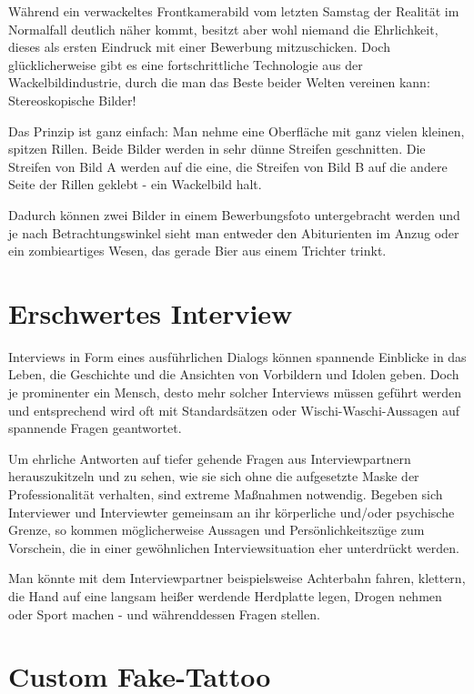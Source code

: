 \documentclass[a5paper,pagesize,10pt,bibtotoc,pointlessnumbers,normalheadings,DIV=9,twoside=false]{scrbook}
\begin{document}
Während ein verwackeltes Frontkamerabild vom letzten Samstag der Realität im Normalfall deutlich näher kommt, besitzt aber wohl niemand die Ehrlichkeit, dieses als ersten Eindruck mit einer Bewerbung mitzuschicken.
Doch glücklicherweise gibt es eine fortschrittliche Technologie aus der Wackelbildindustrie, durch die man das Beste beider Welten vereinen kann:
Stereoskopische Bilder!

Das Prinzip ist ganz einfach:
Man nehme eine Oberfläche mit ganz vielen kleinen, spitzen Rillen.
Beide Bilder werden in sehr dünne Streifen geschnitten.
Die Streifen von Bild A werden auf die eine, die Streifen von Bild B auf die andere Seite der Rillen geklebt - ein Wackelbild halt.

Dadurch können zwei Bilder in einem Bewerbungsfoto untergebracht werden und je nach Betrachtungswinkel sieht man entweder den Abiturienten im Anzug oder ein zombieartiges Wesen, das gerade Bier aus einem Trichter trinkt.

\chapter{Erschwertes Interview}

Interviews in Form eines ausführlichen Dialogs können spannende Einblicke in das Leben, die Geschichte und die Ansichten von Vorbildern und Idolen geben.
Doch je prominenter ein Mensch, desto mehr solcher Interviews müssen geführt werden und entsprechend wird oft mit Standardsätzen oder Wischi-Waschi-Aussagen auf spannende Fragen geantwortet.

Um ehrliche Antworten auf tiefer gehende Fragen aus Interviewpartnern herauszukitzeln und zu sehen, wie sie sich ohne die aufgesetzte Maske der Professionalität verhalten, sind extreme Maßnahmen notwendig.
Begeben sich Interviewer und Interviewter gemeinsam an ihr körperliche und/oder psychische Grenze, so kommen möglicherweise Aussagen und Persönlichkeitszüge zum Vorschein, die in einer gewöhnlichen Interviewsituation eher unterdrückt werden.

Man könnte mit dem Interviewpartner beispielsweise Achterbahn fahren, klettern, die Hand auf eine langsam heißer werdende Herdplatte legen, Drogen nehmen oder Sport machen - und währenddessen Fragen stellen.


\chapter{Custom Fake-Tattoo}
\end{document}
